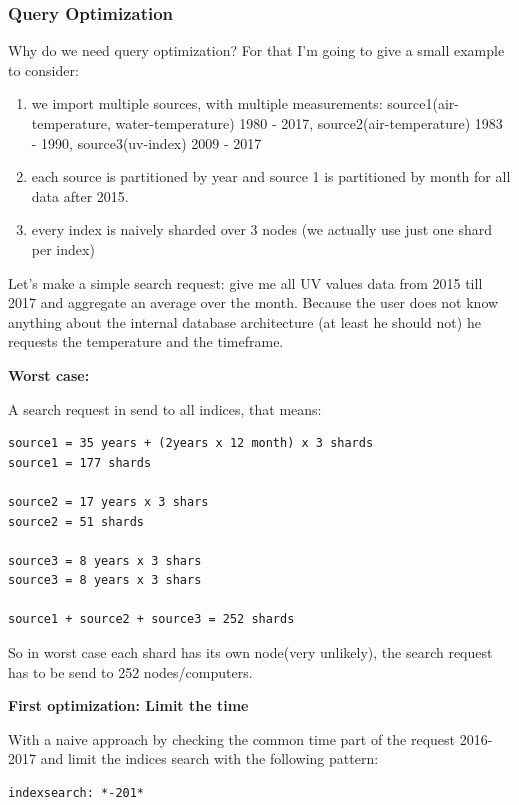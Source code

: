 \subsubsection{Query Optimization}\label{query-optimization}

Why do we need query optimization? For that I'm going to give a small
example to consider:

\begin{enumerate}
\def\labelenumi{\arabic{enumi}.}
\tightlist
\item
  we import multiple sources, with multiple measurements:
  source1(air-temperature, water-temperature) 1980 - 2017,
  source2(air-temperature) 1983 - 1990, source3(uv-index) 2009 - 2017
\item
  each source is partitioned by year and source 1 is partitioned by
  month for all data after 2015.
\item
  every index is naively sharded over 3 nodes (we actually use just one
  shard per index)
\end{enumerate}

Let's make a simple search request: give me all UV values data from 2015
till 2017 and aggregate an average over the month. Because the user does
not know anything about the internal database architecture (at least he
should not) he requests the temperature and the timeframe.

\textbf{Worst case:}

A search request in send to all indices, that means:

\begin{verbatim}
source1 = 35 years + (2years x 12 month) x 3 shards
source1 = 177 shards

source2 = 17 years x 3 shars
source2 = 51 shards

source3 = 8 years x 3 shars
source3 = 8 years x 3 shars

source1 + source2 + source3 = 252 shards
\end{verbatim}

So in worst case each shard has its own node(very unlikely), the search
request has to be send to 252 nodes/computers.

\textbf{First optimization: Limit the time}

With a naive approach by checking the common time part of the request
2016-2017 and limit the indices search with the following pattern:

\begin{verbatim}
indexsearch: *-201*
\end{verbatim}

